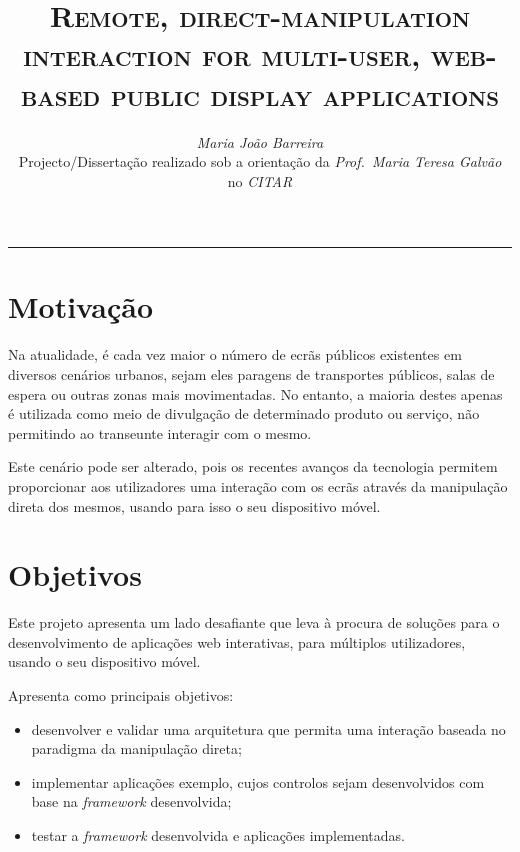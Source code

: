 \documentclass[9pt,a4paper]{extarticle}
\begin{document}
\title{\vspace*{-8mm}\textbf{\textsc{Remote, direct-manipulation
interaction for multi-user, web-based
public display applications}}}
\author{\emph{Maria João Barreira}\\[2mm]
\small{Projecto/Dissertação realizado sob a orientação da \emph{Prof.\ Maria Teresa Galvão}}\\
\small{no \emph{CITAR}}}
\date{}
\maketitle
\thispagestyle{empty}

\vspace*{-4mm}\noindent\rule{\textwidth}{0.4pt}\vspace*{4mm}

\begin{multicols}{2}

\section{Motivação}\label{sec:motiva}

Na atualidade, é cada vez maior o número de ecrãs públicos existentes em diversos
cenários urbanos, sejam eles paragens de transportes públicos, salas de espera ou outras
zonas mais movimentadas. No entanto, a maioria destes apenas é utilizada como meio de
divulgação de determinado produto ou serviço, não permitindo ao transeunte interagir
com o mesmo.

Este cenário pode ser alterado, pois os recentes avanços da tecnologia permitem proporcionar
aos utilizadores uma interação com os ecrãs através da manipulação direta
dos mesmos, usando para isso o seu dispositivo móvel.

\section{Objetivos}\label{sec:goals}


Este projeto apresenta um lado desafiante que leva à procura de soluções para
o desenvolvimento de aplicações web interativas, para múltiplos utilizadores, usando o seu dispositivo móvel.

Apresenta como principais objetivos:
\begin{itemize}
\item desenvolver e validar uma arquitetura
que permita uma interação baseada no paradigma da manipulação direta;
\item implementar aplicações exemplo, cujos controlos sejam desenvolvidos com base na \textit{framework}
desenvolvida;
\item testar a \textit{framework} desenvolvida e aplicações implementadas.
\end{itemize}


\end{multicols}
\end{document}
